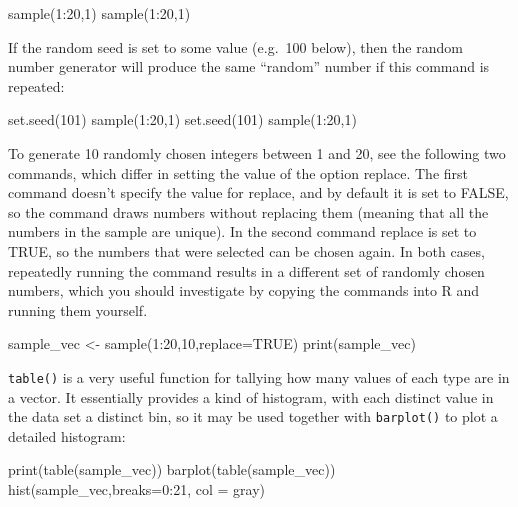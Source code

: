 \documentclass[
  letterpaper,
  DIV=11,
  numbers=noendperiod]{scrreprt}
\newenvironment{Shaded}{\begin{snugshade}}{\end{snugshade}}
\newcommand{\NormalTok}[1]{\textcolor[rgb]{0.00,0.23,0.31}{#1}}
\begin{document}
\begin{Shaded}
\begin{Highlighting}[]
\NormalTok{sample(1:20,1)}
\NormalTok{sample(1:20,1)}
\end{Highlighting}
\end{Shaded}

If the random seed is set to some value (e.g.~100 below), then the
random number generator will produce the same ``random'' number if this
command is repeated:

\begin{Shaded}
\begin{Highlighting}[]
\NormalTok{set.seed(101)}
\NormalTok{sample(1:20,1)}
\NormalTok{set.seed(101)}
\NormalTok{sample(1:20,1)}
\end{Highlighting}
\end{Shaded}

To generate 10 randomly chosen integers between 1 and 20, see the
following two commands, which differ in setting the value of the option
replace. The first command doesn't specify the value for replace, and by
default it is set to FALSE, so the command draws numbers without
replacing them (meaning that all the numbers in the sample are unique).
In the second command replace is set to TRUE, so the numbers that were
selected can be chosen again. In both cases, repeatedly running the
command results in a different set of randomly chosen numbers, which you
should investigate by copying the commands into R and running them
yourself.

\begin{Shaded}
\begin{Highlighting}[]
\NormalTok{sample\_vec \textless{}{-} sample(1:20,10,replace=TRUE)}
\NormalTok{print(sample\_vec)}
\end{Highlighting}
\end{Shaded}

\texttt{table()} is a very useful function for tallying how many values
of each type are in a vector. It essentially provides a kind of
histogram, with each distinct value in the data set a distinct bin, so
it may be used together with \texttt{barplot()} to plot a detailed
histogram:

\begin{Shaded}
\begin{Highlighting}[]
\NormalTok{print(table(sample\_vec))}
\NormalTok{barplot(table(sample\_vec))}
\NormalTok{hist(sample\_vec,breaks=0:21, col = \textquotesingle{}gray\textquotesingle{})}
\end{Highlighting}
\end{Shaded}
\end{document}
